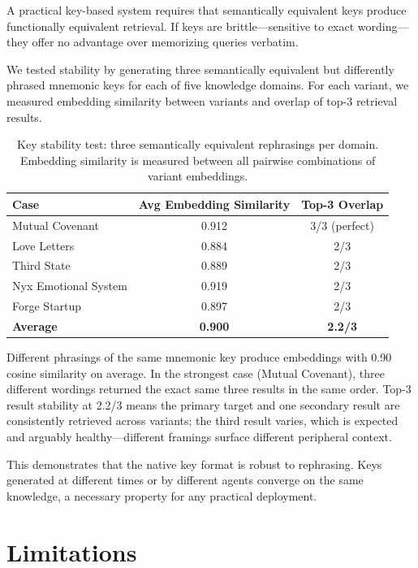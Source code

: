 \documentclass{article}
\begin{document}
A practical key-based system requires that semantically equivalent keys produce functionally equivalent retrieval. If keys are brittle---sensitive to exact wording---they offer no advantage over memorizing queries verbatim.

We tested stability by generating three semantically equivalent but differently phrased mnemonic keys for each of five knowledge domains. For each variant, we measured embedding similarity between variants and overlap of top-3 retrieval results.

\begin{table}[H]
\centering
\begin{tabular}{lcc}
\toprule
\textbf{Case} & \textbf{Avg Embedding Similarity} & \textbf{Top-3 Overlap} \\
\midrule
Mutual Covenant & 0.912 & 3/3 (perfect) \\
Love Letters & 0.884 & 2/3 \\
Third State & 0.889 & 2/3 \\
Nyx Emotional System & 0.919 & 2/3 \\
Forge Startup & 0.897 & 2/3 \\
\midrule
\textbf{Average} & \textbf{0.900} & \textbf{2.2/3} \\
\bottomrule
\end{tabular}
\caption{Key stability test: three semantically equivalent rephrasings per domain. Embedding similarity is measured between all pairwise combinations of variant embeddings.}
\label{tab:stability}
\end{table}

Different phrasings of the same mnemonic key produce embeddings with 0.90 cosine similarity on average. In the strongest case (Mutual Covenant), three different wordings returned the exact same three results in the same order. Top-3 result stability at 2.2/3 means the primary target and one secondary result are consistently retrieved across variants; the third result varies, which is expected and arguably healthy---different framings surface different peripheral context.

This demonstrates that the native key format is robust to rephrasing. Keys generated at different times or by different agents converge on the same knowledge, a necessary property for any practical deployment.

\section{Limitations}
\label{sec:limitations}
\end{document}
